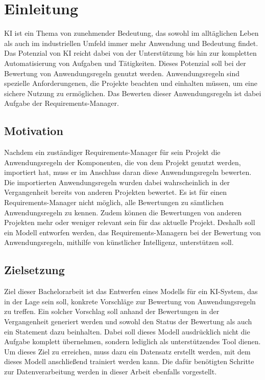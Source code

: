 \chapter{Einleitung}
\label{chap:einleitung}
\ac{KI} ist ein Thema von zunehmender Bedeutung, das sowohl im alltäglichen Leben als auch im industriellen Umfeld immer mehr Anwendung und Bedeutung findet. Das Potenzial von \ac{KI}
reicht dabei von der Unterstützung bis hin zur kompletten Automatisierung von Aufgaben und Tätigkeiten. Dieses Potenzial soll bei der Bewertung von Anwendungsregeln genutzt werden.
Anwendungsregeln sind spezielle Anforderungenen, die Projekte beachten und einhalten müssen, um eine sichere Nutzung zu ermöglichen.
Das Bewerten dieser Anwendungsregeln ist dabei Aufgabe der Requirements-Manager.  

\section{Motivation}
\label{chap:Motivation}
Nachdem ein zuständiger Requirements-Manager für sein Projekt die Anwendungsregeln der Komponenten, die von dem Projekt genutzt werden, importiert hat, muss er im Anschluss daran
diese Anwendungsregeln bewerten. Die importierten Anwendungsregeln wurden dabei wahrscheinlich in der Vergangenheit bereits von anderen Projekten bewertet. 
Es ist für einen Requirements-Manager nicht möglich, alle Bewertungen zu sämtlichen Anwendungsregeln zu kennen. Zudem können die Bewertungen von anderen Projekten mehr oder weniger relevant 
sein für das aktuelle Projekt. Deshalb soll ein Modell entworfen werden, das Requirements-Managern bei der Bewertung von Anwendungsregeln, mithilfe von künstlicher Intelligenz, unterstützen soll.

\section{Zielsetzung}
\label{chap:Zielsetzung}
Ziel dieser Bachelorarbeit ist das Entwerfen eines Modells für ein \ac{KI}-System, das in der Lage sein soll, konkrete Vorschläge zur Bewertung von Anwendungsregeln zu treffen.
Ein solcher Vorschlag soll anhand der Bewertungen in der Vergangenheit generiert werden und sowohl den Status der Bewertung als auch ein Statement dazu beinhalten.
Dabei soll dieses Modell ausdrücklich nicht die Aufgabe komplett übernehmen, sondern lediglich als unterstützendes Tool dienen. 
Um dieses Ziel zu erreichen, muss dazu ein Datensatz erstellt werden, mit dem dieses Modell anschließend trainiert werden kann. Die dafür benötigten Schritte zur 
Datenverarbeitung werden in dieser Arbeit ebenfalls vorgestellt. 

